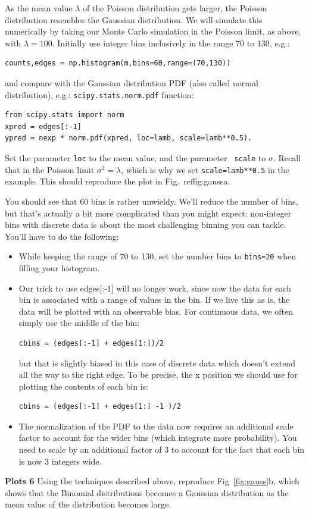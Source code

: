 As the mean value $\lambda$ of the Poisson distribution gets larger,
the Poisson distribution resembles the Gaussian distribution.  We will
simulate this numerically by taking our Monte Carlo simulation in the
Poisson limit, as above, with $\lambda = 100$.  Initially use
integer bins inclusively in the range 70 to 130, e.g.:
\begin{verbatim}
counts,edges = np.histogram(m,bins=60,range=(70,130))
\end{verbatim}
and compare with the Gaussian distribution PDF (also called normal distribution), e.g.:
{\tt scipy.stats.norm.pdf} function:
\begin{verbatim}
from scipy.stats import norm
xpred = edges[:-1]
ypred = nexp * norm.pdf(xpred, loc=lamb, scale=lamb**0.5). 
\end{verbatim}

Set the parameter {\tt loc} to the mean value, and the parameter {\tt
  scale} to $\sigma$.  Recall that in the Poisson limit $\sigma^2 =
\lambda$, which is why we set {\tt scale=lamb**0.5} in the example.
This should reproduce the plot in Fig.~ref{fig:gauss}a.  

You should see that 60 bins is rather unwieldy.  We'll reduce the number
of bins, but that's actually a bit more complicated than you might
expect: non-integer bins with discrete data is about the most
challenging binning you can tackle.  You'll have to do the following:
\begin{itemize}
\item While keeping the range of 70 to 130, set the number bins to {\tt bins=20} when filling your histogram.
\item Our trick to use edges[:-1] will no longer work, since now the data for each bin is associated with a range of values in the bin.  If we live this as is, the data will be plotted with an observable bias.  For continuous data, we often simply use the middle of the bin:
\begin{verbatim}
cbins = (edges[:-1] + edges[1:])/2 
\end{verbatim}
but that is slightly biased in this case of discrete data which doesn't extend  all the way to the right edge.  To be precise, the x position we should use for plotting the contents of each bin is:
\begin{verbatim}
cbins = (edges[:-1] + edges[1:] -1 )/2 
\end{verbatim}
\item The normalization of the PDF to the data now requires an additional scale factor to account for the wider bins (which integrate more probability).  You need to scale by an additional factor of 3 to account for the fact that each bin is now 3 integers wide.
\end{itemize}
{\bf }

{\bf Plots 6} Using the techniques described above, reproduce Fig~\ref{fig:gauss}b, which shows that the Binomial distributions becomes a Gaussian distribution as the mean value of the distribution becomes large.
























